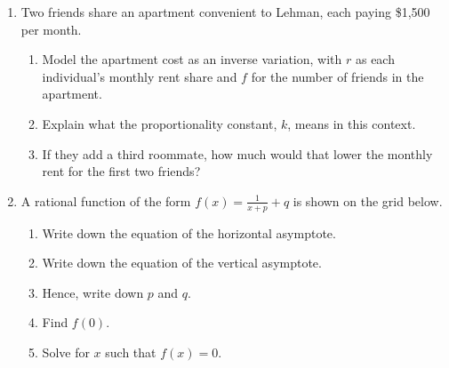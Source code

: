 \documentclass[12pt, twoside]{article}
\begin{document}
\begin{enumerate}
\item Two friends share an apartment convenient to Lehman, each paying \$1,500 per month.
\begin{enumerate}[itemsep=1.25cm]
    \item Model the apartment cost as an inverse variation, with $r$ as each individual's monthly rent share and $f$ for the number of friends in the apartment.
    \item Explain what the proportionality constant, $k$, means in this context.
    \item If they add a third roommate, how much would that lower the monthly rent for the first two friends?
\end{enumerate}

\newpage
\item A rational function of the form $\displaystyle f(x)=\frac{1}{x+p}+q$ is shown on the grid below. 
    \begin{multicols}{2}
        \begin{enumerate}[itemsep=1cm]
            \item Write down the equation of the horizontal asymptote.
            \item  Write down the equation of the vertical asymptote.
            \item Hence, write down $p$ and $q$.
            \item Find $f(0)$.
            \item Solve for $x$ such that $f(x)=0$.
        \end{enumerate}
    \end{multicols}


\end{enumerate}
\end{document}
